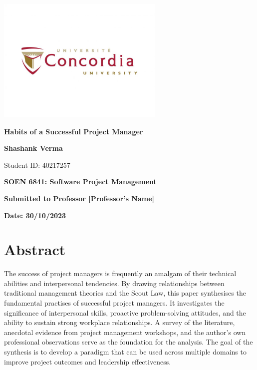 \documentclass{article}
\begin{document}
\begin{titlepage}
    \centering
    \vspace*{1cm}
    \includegraphics[width=0.6\textwidth]{Logo.jpg} %
    \par\vspace{0.5cm}
    {\Huge\textbf{Habits of a Successful Project Manager}\par}
    \vspace{1.5cm}
    {\Large\textbf{Shashank Verma}\par}
    \vspace{0.5cm}
    {Student ID: 40217257\par}
    \vspace{2cm}
    {\Large\textbf{SOEN 6841: Software Project Management}\par}
    \vspace{1cm}
    {\large\textbf{Submitted to Professor [Professor's Name]}\par} %
    \vfill
    {\large\textbf{Date: 30/10/2023}\par}
\end{titlepage}

\newpage
\tableofcontents
\newpage
{}

\section{Abstract}
The success of project managers is frequently an amalgam of their technical abilities and interpersonal tendencies. By drawing relationships between traditional management theories and the Scout Law, this paper synthesises the fundamental practises of successful project managers. It investigates the significance of interpersonal skills, proactive problem-solving attitudes, and the ability to sustain strong workplace relationships. A survey of the literature, anecdotal evidence from project management workshops, and the author's own professional observations serve as the foundation for the analysis. The goal of the synthesis is to develop a paradigm that can be used across multiple domains to improve project outcomes and leadership effectiveness.
\end{document}
